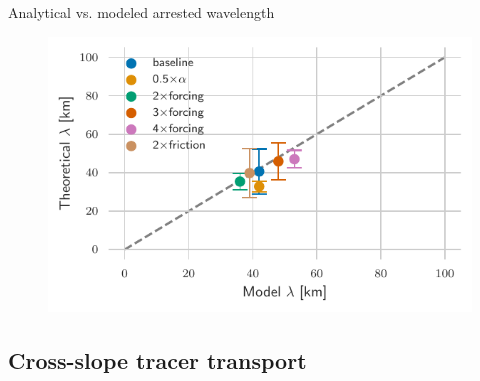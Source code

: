 \documentclass{beamer}
\begin{document}
\begin{frame}{Analytical vs. modeled arrested wavelength}
\begin{figure}
\centering
\includegraphics{figures/Unstratified_theoreticalVSmodel_wave_length.pdf}
\end{figure}
\end{frame}

%


\subsection{Cross-slope tracer transport}
\end{document}
